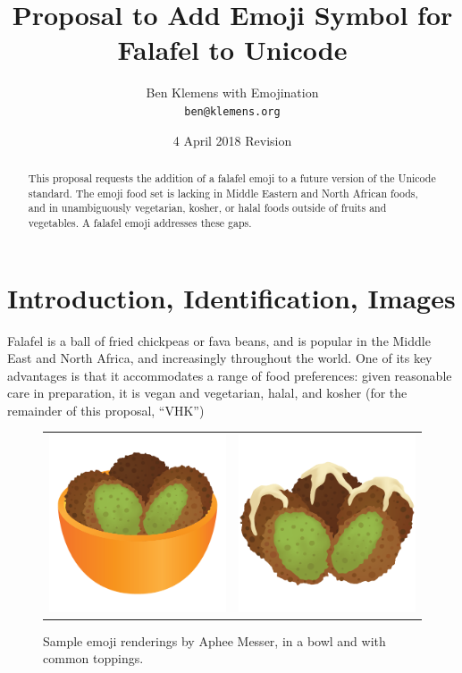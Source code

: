\documentclass[a4paper,10pt]{article}
\begin{document}




\title{Proposal to Add Emoji Symbol for {\sc Falafel} to Unicode}
\author{Ben Klemens with Emojination\\ {\tt ben@klemens.org}}
\date{4 April 2018 Revision}
\maketitle

\begin{abstract}
This proposal requests the addition of a {\sc falafel} emoji to a future version of the
Unicode standard.  The emoji food set is lacking in Middle Eastern and North African
foods, and in unambiguously vegetarian, kosher, or halal foods outside of fruits and
vegetables. A falafel emoji addresses these gaps.
\end{abstract}


\section{Introduction, Identification, Images}

{\sc Falafel} is a ball of fried chickpeas or fava beans, and is popular in the Middle East
and North Africa, and increasingly throughout the world.  One of its key advantages is
that it accommodates a range of food preferences: given reasonable care in preparation,
it is vegan and vegetarian, halal, and kosher (for the remainder of this proposal, ``VHK'')

\begin{figure}[h]
\begin{center}
\begin{tabular}{cc}
\includegraphics[width=2.2in]{falafel-bowl.png}& \includegraphics[width=2.2in]{falafel-tahini.png}
\end{tabular}
\end{center}
\caption{Sample emoji renderings by Aphee Messer, in a bowl and with common toppings.}
\label{apheefig}
\end{figure}
\end{document}
